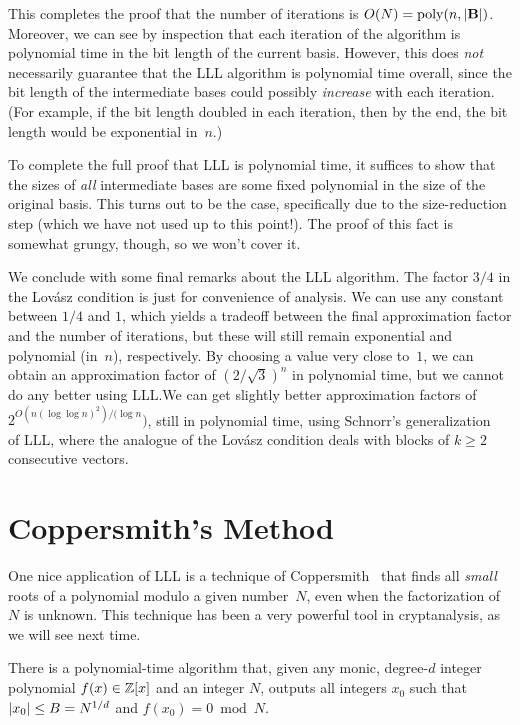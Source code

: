 \documentclass[11pt]{article}
\begin{document}
This completes the proof that the number of iterations is
$O(N) = \operatorname{poly}(n, \lvert\mathbf{B}\rvert)$. Moreover, we can see by inspection
that each iteration of the algorithm is polynomial time in the bit
length of the current basis. However, this does \emph{not} necessarily
guarantee that the LLL algorithm is polynomial time overall, since the
bit length of the intermediate bases could possibly \emph{increase}
with each iteration. (For example, if the bit length doubled in each
iteration, then by the end, the bit length would be exponential
in~$n$.)

To complete the full proof that LLL is polynomial time, it suffices to
show that the sizes of \emph{all} intermediate bases are some fixed
polynomial in the size of the original basis. This turns out to be the
case, specifically due to the size-reduction step (which we have not
used up to this point!). The proof of this fact is somewhat grungy,
though, so we won't cover it.

We conclude with some final remarks about the LLL algorithm. The
factor $3/4$ in the Lov{\'a}sz condition is just for convenience of
analysis. We can use any constant between $1/4$ and $1$, which yields
a tradeoff between the final approximation factor and the number of
iterations, but these will still remain exponential and polynomial
(in~$n$), respectively. By choosing a value very close to~$1$, we can
obtain an approximation factor of $(2/\sqrt{3})^{n}$ in polynomial
time, but we cannot do any better using LLL.\@ We can get slightly
better approximation factors of $2^{O(n(\log\log n)^2)/(\log n})$,
still in polynomial time, using Schnorr's
generalization~\cite{DBLP:journals/tcs/Schnorr87} of LLL, where the
analogue of the Lov{\'a}sz condition deals with blocks of $k \geq 2$
consecutive vectors.

\section{Coppersmith's Method}
\label{sec:coppersmiths-method}

One nice application of LLL is a technique of
Coppersmith~\cite{DBLP:conf/eurocrypt/Coppersmith96} that finds all
\emph{small} roots of a polynomial modulo a given number~$N$, even
when the factorization of $N$ is unknown. This technique has been a
very powerful tool in cryptanalysis, as we will see next time.

\begin{theorem}
  \label{thm:coppersmith}
  There is a polynomial-time algorithm that, given any monic,
  degree-$d$ integer polynomial $f(x) \in \mathbb{Z}[x]$ and an integer $N$,
  outputs all integers $x_{0}$ such that
  $\lvert x_{0}\rvert \leq B = N^{1/d}$ and $f(x_{0}) = 0 \bmod N$.
\end{theorem}
\end{document}
